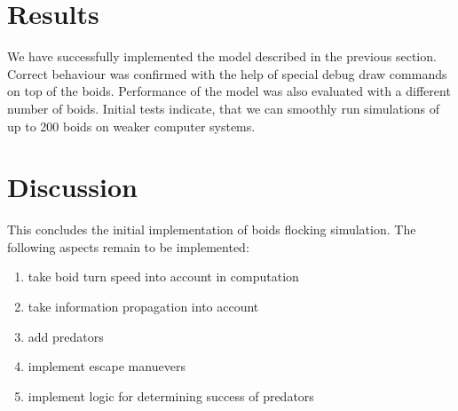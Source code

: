 \documentclass[9pt]{pnas-new}
\begin{document}
\section*{Results}
We have successfully implemented the model described in the previous section. Correct behaviour was confirmed
with the help of special debug draw commands on top of the boids. Performance of the model was also evaluated with a
different number of boids. Initial tests indicate, that we can smoothly run simulations of up to 200 boids on weaker computer systems.
\section*{Discussion}
This concludes the initial implementation of boids flocking simulation.
The following aspects remain to be implemented:
\begin{enumerate}
	\item take boid turn speed into account in computation
	\item take information propagation into account
	\item add predators
	\item implement escape manuevers
	\item implement logic for determining success of predators
\end{enumerate}


\showacknow %


\begin{multicols}{2}
	\section*{\bibname}
	
\end{multicols}
\end{document}
